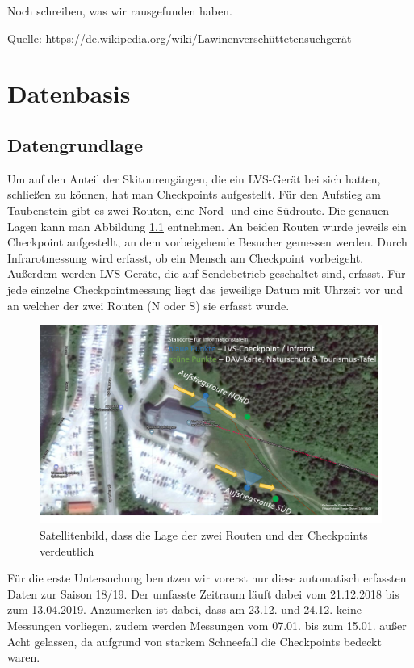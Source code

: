 \documentclass[12pt]{scrreprt}
\begin{document}
	Noch schreiben, was wir rausgefunden haben.
	
	Quelle:
	\url{https://de.wikipedia.org/wiki/Lawinenverschüttetensuchgerät}
	
	\chapter{Datenbasis}
	\section{Datengrundlage}
	Um auf den Anteil der Skitourengängen, die ein LVS-Gerät bei sich hatten, schließen zu können, hat man Checkpoints aufgestellt. Für den Aufstieg am Taubenstein gibt es zwei Routen, eine Nord- und eine Südroute. Die genauen Lagen kann man Abbildung \ref{pic:checkpoints} entnehmen. An beiden Routen wurde jeweils ein Checkpoint aufgestellt, an dem vorbeigehende Besucher gemessen werden. Durch Infrarotmessung wird erfasst, ob ein Mensch am Checkpoint vorbeigeht. Außerdem werden LVS-Geräte, die auf Sendebetrieb geschaltet sind, erfasst. Für jede einzelne Checkpointmessung liegt das jeweilige Datum mit Uhrzeit vor und an welcher der zwei Routen (N oder S) sie erfasst wurde.
	
	\begin{figure}[H]
		\centering
		\includegraphics[width=.9\textwidth]{bilder/checkpoints}
		\caption{Satellitenbild, dass die Lage der zwei Routen und der Checkpoints verdeutlich}
		\label{pic:checkpoints}
	\end{figure}
	
	\noindent Für die erste Untersuchung benutzen wir vorerst nur diese automatisch erfassten Daten zur Saison 18/19. Der umfasste Zeitraum läuft dabei vom 21.12.2018 bis zum 13.04.2019. Anzumerken ist dabei, dass am 23.12. und 24.12. keine Messungen vorliegen, zudem werden Messungen vom 07.01. bis zum 15.01. außer Acht gelassen, da aufgrund von starkem Schneefall die Checkpoints bedeckt waren.
	
\end{document}
